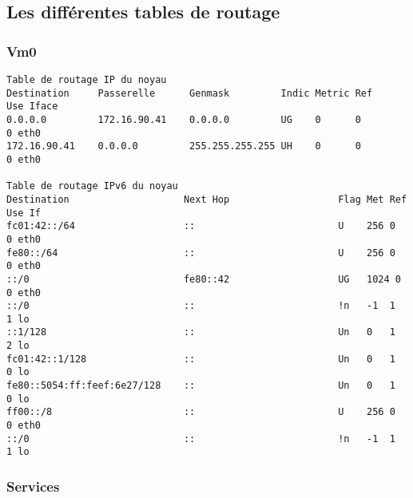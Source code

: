 \newpage

	\subsection{\label{routeVm0}Les différentes tables de routage}
		\subsubsection{Vm0}
		\vspace{0.3cm}

\begin{verbatim}
Table de routage IP du noyau
Destination     Passerelle      Genmask         Indic Metric Ref    Use Iface
0.0.0.0         172.16.90.41    0.0.0.0         UG    0      0        0 eth0
172.16.90.41    0.0.0.0         255.255.255.255 UH    0      0        0 eth0

Table de routage IPv6 du noyau
Destination                    Next Hop                   Flag Met Ref Use If
fc01:42::/64                   ::                         U    256 0     0 eth0
fe80::/64                      ::                         U    256 0     0 eth0
::/0                           fe80::42                   UG   1024 0     0 eth0
::/0                           ::                         !n   -1  1     1 lo
::1/128                        ::                         Un   0   1     2 lo
fc01:42::1/128                 ::                         Un   0   1     0 lo
fe80::5054:ff:feef:6e27/128    ::                         Un   0   1     0 lo
ff00::/8                       ::                         U    256 0     0 eth0
::/0                           ::                         !n   -1  1     1 lo
\end{verbatim}

\newpage

		\subsubsection{\label{routeServices}Services}
		\vspace{0.3cm}

